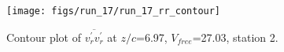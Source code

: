 \begin{figure}[H]
\centering
\texttt{[image: figs/run\_17/run\_17\_rr\_contour]}
\caption{Contour plot of $\overline{v_{r}^{\prime} v_{r}^{\prime}}$ at $z/c$=6.97, $V_{free}$=27.03, station 2.}
\label{fig:run_17_rr_contour}
\end{figure}



